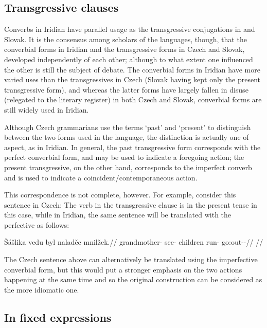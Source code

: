 \subsection{Transgressive clauses}

Converbs in Iridian have parallel usage as the transgressive conjugations in  and Slovak. It is the consensus among scholars of the languages, though, that the converbial forms in Iridian and the transgressive forms in Czech and Slovak, developed independently of each other; although to what extent one influenced the other is still the subject of debate. The converbial forms in Iridian have more varied uses than the transgressives in Czech (Slovak having kept only the present transgressive form), and whereas the latter forms have largely fallen in disuse (relegated to the literary register) in both Czech and Slovak, converbial forms are still widely used in Iridian.

Although Czech grammarians use the terms `past' and `present' to distinguish between the two forms used in the language, the distinction is actually one of aspect, as in Iridian. In general, the past transgressive form corresponds with the perfect converbial form, and may be used to indicate a foregoing action; the present transgressive, on the other hand, corresponds to the imperfect converb and is used to indicate a coincident/contemporaneous action.

This correspondence is not complete, however. For example, consider this sentence in Czech:  The verb in the transgressive clause is in the present tense in this case, while in Iridian, the same sentence will be translated with the perfective as follows:

\pex
\begingl
\gla \v{S}ášlika vedu byl naladěc mnilžek.//
\glb grandmother- see- children run- go:out-\Av{}-\Pf{}//
\glft {}//
\endgl
\xe

The Czech sentence above can alternatively be translated using the imperfective converbial form, but this would put a stronger emphasis on the two actions happening at the same time and so the original construction can be considered as the more idiomatic one.

\subsection{In fixed expressions}

